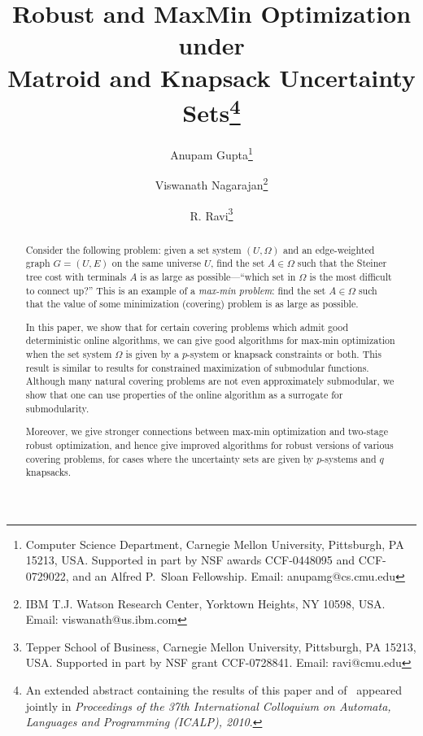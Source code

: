 \documentclass[11pt,letterpaper]{article}
\newcommand{\I}{{\Omega}}
\begin{document}
\title{Robust and MaxMin Optimization under \\Matroid and Knapsack
  Uncertainty Sets\thanks{An extended abstract containing the results of
    this paper and of~\cite{GNR-k-rob} appeared jointly in
    \emph{Proceedings of the 37th International Colloquium on Automata,
      Languages and Programming (ICALP), 2010}.}}

\author{
Anupam Gupta\thanks{Computer Science Department, Carnegie Mellon
    University, Pittsburgh, PA 15213, USA. Supported in part by
    NSF awards CCF-0448095 and CCF-0729022, and an Alfred P.~Sloan
    Fellowship. Email: anupamg@cs.cmu.edu}
\and Viswanath Nagarajan\thanks{IBM T.J. Watson Research Center, Yorktown Heights, NY 10598, USA. Email:
viswanath@us.ibm.com} \and R. Ravi\thanks{Tepper School of Business, Carnegie Mellon University,
  Pittsburgh, PA 15213, USA. Supported in part by NSF grant
  CCF-0728841. Email: ravi@cmu.edu}
}
\date{}
\maketitle

\begin{abstract}
  Consider the following problem: given a set system $(U,\I)$ and an edge-weighted
  graph $G = (U, E)$ on the same universe $U$, find the set $A \in \I$ such
  that the Steiner tree cost with terminals $A$ is as large as
  possible---``which set in $\I$ is the most difficult to connect up?''
  This is an example of a \emph{max-min problem}: find the set $A \in
  \I$ such that the value of some minimization (covering) problem is as
  large as possible.

  In this paper, we show that for certain covering problems which admit
  good deterministic online algorithms, we can give good algorithms for
  max-min optimization when the set system $\I$ is given by a $p$-system
  or knapsack constraints or both. This result is similar to results for constrained
  maximization of submodular functions. Although many natural covering problems
  are not even approximately submodular, we show that one can use
  properties of the online algorithm as a surrogate for submodularity.

  Moreover, we give stronger connections between max-min optimization
  and two-stage robust optimization, and hence give improved algorithms
  for robust versions of various covering problems, for cases where the
  uncertainty sets are given by $p$-systems and $q$ knapsacks.
\end{abstract}
\end{document}
